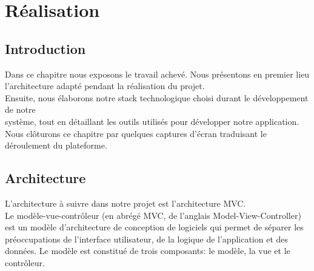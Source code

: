 \chapter{Réalisation}
\label{sec:quatriemechapitre}



\section{Introduction}
Dans ce chapitre nous exposons le travail achevé. Nous présentons en premier lieu l’architecture adapté pendant la réalisation du projet.\\ Ensuite, nous élaborons notre stack technologique choisi durant le développement de notre\\ système, tout en détaillant les outils utilisés pour développer notre application.\\ Nous clôturons ce chapitre par quelques captures d'écran traduisant le déroulement du plateforme.

\section{Architecture}
L’architecture à suivre dans notre projet est l’architecture MVC.\\
Le modèle-vue-contrôleur (en abrégé MVC, de l’anglais Model-View-Controller) est un modèle d'architecture de conception de logiciels qui permet de séparer les préoccupations de l'interface utilisateur, de la logique de l'application et des données. Le modèle est constitué de trois composants: le modèle, la vue et le contrôleur.


